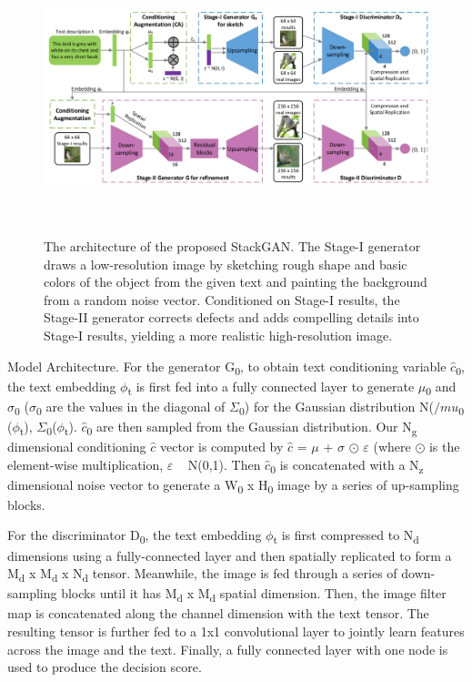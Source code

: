 \documentclass[a4paper,12pt,oneside]{article}
\begin{document}
\begin{figure}[H]
\centering
\includegraphics[height=8cm,width=15cm]{Figure2.png}
\caption[The architecture of the proposed StackGAN]{The architecture of the proposed StackGAN. The Stage-I generator draws a low-resolution image by sketching rough shape and basic colors of the object from the given text and painting the background from a random noise vector. Conditioned on Stage-I results, the Stage-II generator corrects defects and adds compelling details into Stage-I results, yielding a more realistic high-resolution image.}
\end{figure}

Model Architecture. For the generator G\textsubscript{0}, to obtain text conditioning variable $\hat{c}$\textsubscript{0}, the text embedding $\phi$\textsubscript{t}  is first fed into a fully connected layer to generate $\mu$\textsubscript{0} and $\sigma$\textsubscript{0} ($\sigma$\textsubscript{0} are the values in the diagonal of $\Sigma$\textsubscript{0}) for the Gaussian distribution N($/mu$\textsubscript{0} ($\phi$\textsubscript{t}), $\Sigma$\textsubscript{0}($\phi$\textsubscript{t}). $\hat{c}$\textsubscript{0} are then sampled from the Gaussian distribution. Our N\textsubscript{g} dimensional conditioning $\hat{c}$ vector  is computed by $\hat{c}$ = $\mu$ + $\sigma$ $\odot$ $\varepsilon$ (where $\odot$ is 
the element-wise multiplication, $\varepsilon$ ~ 
N(0,1). Then $\hat{c}$\textsubscript{0} 
is concatenated with a N\textsubscript{z} 
dimensional noise vector to generate a W\textsubscript{0} x H\textsubscript{0} image by a series of up-sampling blocks.

For the discriminator D\textsubscript{0}, the text embedding $\phi$\textsubscript{t} is first compressed to N\textsubscript{d}  dimensions using a fully-connected layer and then spatially replicated to form a M\textsubscript{d} x M\textsubscript{d} x N\textsubscript{d} tensor. Meanwhile, the image is fed through a series of down-sampling blocks until it has M\textsubscript{d} x M\textsubscript{d} spatial dimension. Then, the image filter map is concatenated along the channel dimension with the text tensor. The resulting tensor is further fed to a 1x1 convolutional layer to jointly learn features across the image and the text. Finally, a fully connected layer with one node is used to produce the decision score. 
\end{document}
